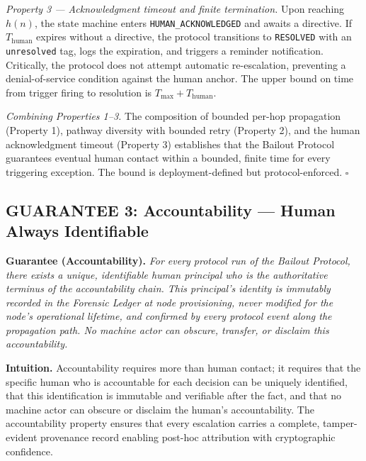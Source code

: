 \medskip
\noindent\textit{Property 3 — Acknowledgment timeout and finite termination.} Upon reaching $h(n)$, the state machine enters \texttt{HUMAN\_ACKNOWLEDGED} and awaits a directive. If $T_{\text{human}}$ expires without a directive, the protocol transitions to \texttt{RESOLVED} with an \texttt{unresolved} tag, logs the expiration, and triggers a reminder notification. Critically, the protocol does not attempt automatic re-escalation, preventing a denial-of-service condition against the human anchor. The upper bound on time from trigger firing to resolution is $T_{\max} + T_{\text{human}}$.

\medskip
\noindent\textit{Combining Properties 1–3.} The composition of bounded per-hop propagation (Property 1), pathway diversity with bounded retry (Property 2), and the human acknowledgment timeout (Property 3) establishes that the Bailout Protocol guarantees eventual human contact within a bounded, finite time for every triggering exception. The bound is deployment-defined but protocol-enforced. $\square$

\subsection{GUARANTEE 3: Accountability — Human Always Identifiable}\label{sec:accountability}

\bigskip
\begin{minipage}{\linewidth}
\textbf{Guarantee (Accountability).} \textit{For every protocol run of the Bailout Protocol, there exists a unique, identifiable human principal who is the authoritative terminus of the accountability chain. This principal's identity is immutably recorded in the Forensic Ledger at node provisioning, never modified for the node's operational lifetime, and confirmed by every protocol event along the propagation path. No machine actor can obscure, transfer, or disclaim this accountability.}
\end{minipage}
\bigskip

\textbf{Intuition.} Accountability requires more than human contact; it requires that the specific human who is accountable for each decision can be uniquely identified, that this identification is immutable and verifiable after the fact, and that no machine actor can obscure or disclaim the human's accountability. The accountability property ensures that every escalation carries a complete, tamper-evident provenance record enabling post-hoc attribution with cryptographic confidence.

